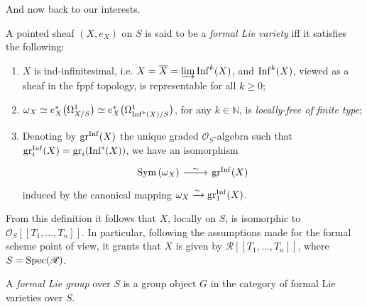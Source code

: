 \noindent
And now back to our interests.
\begin{defn}\label{defn:FormalLieVarfppf}
	A pointed sheaf $\left(X, e_X\right)$ on $S$ is said to be
	a \emph{formal Lie variety} iff it satisfies the following:
\begin{enumerate}
	\item $X$ is ind-infinitesimal,
		i.e$.$ \(X = \overline{X} = \varinjlim \operatorname{Inf}^k(X)\),
		and $\operatorname{Inf}^k(X)$, viewed as a sheaf in
		the fppf topology, is representable for all $k \geq 0$;

	\item $\omega_X \simeq
		e_X^* \big( \Omega_{X/S}^1 \big)
		\simeq e_X^* \big( \Omega^1_{\operatorname{Inf}^k(X)/S} \big)$, for any $k \in \mathbb{N}$,
		is \emph{locally-free of finite type};

	\item Denoting by $\mathrm{gr}^{\operatorname{Inf}}(X)$ the unique graded $\mathcal{O}_{ S }$-algebra
		such that $\mathrm{gr}^{\operatorname{Inf}}_i(X) = \mathrm{gr}_i(\operatorname{Inf}^i(X))$,
		we have an isomorphism
		\begin{equation*}
		\begin{tikzcd}[row sep = 0ex
			,/tikz/column 1/.append style={anchor=base east}
			,/tikz/column 2/.append style={anchor=base west}]
		\sym\left( \omega_X \right) \arrow[r, "\sim", rightarrow] &
				\mathrm{gr}^{\Inf}(X)
		\end{tikzcd}
		\end{equation*}
		induced by the canonical mapping
		$\omega_X \xrightarrow{\sim} \mathrm{gr}_1^{\operatorname{Inf}}(X)$.
\end{enumerate}
\end{defn}


\begin{rem}\label{rem:FormalLieVarietyPowerSeries}
	From this definition it follows that $X$, locally on $S$,
	is isomorphic to $\mathcal{O}_S [\![ T_1, \ldots, T_n ]\!]$.
	In particular, following the assumptions made for the formal scheme point of view,
	it grants that $X$ is given by
	$\mathscr{R} [\![ T_1, \ldots, T_n ]\!]$,
	where $S = \operatorname{Spec}(\mathscr{R})$.
\end{rem}


\begin{defn}
	A \emph{formal Lie group} over $S$ is a group object $G$
	in the category of formal Lie varieties over $S$.
\end{defn}


